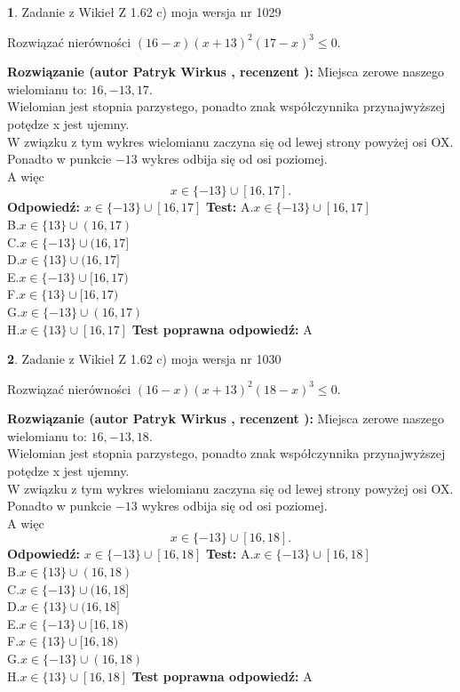 \documentclass[12pt, a4paper]{article}
\theoremstyle{definition} %
\newtheorem{zad}{}
\newcommand{\zadStart}[1]{\begin{zad}#1\newline}
\newcommand{\zadStop}{\end{zad}}
\newcommand{\rozwStart}[2]{\noindent \textbf{Rozwiązanie (autor #1 , recenzent #2): }\newline}
\newcommand{\rozwStop}{\newline}
\newcommand{\odpStart}{\noindent \textbf{Odpowiedź:}\newline}
\newcommand{\odpStop}{\newline}
\newcommand{\testStart}{\noindent \textbf{Test:}\newline}
\newcommand{\testStop}{\newline}
\newcommand{\kluczStart}{\noindent \textbf{Test poprawna odpowiedź:}\newline}
\newcommand{\kluczStop}{\newline}
\begin{document}
\zadStart{Zadanie z Wikieł Z 1.62 c) moja wersja nr 1029}

Rozwiązać nierówności $(16-x)(x+13)^{2}(17-x)^{3}\le0$.
\zadStop
\rozwStart{Patryk Wirkus}{}
Miejsca zerowe naszego wielomianu to: $16, -13, 17$.\\
Wielomian jest stopnia parzystego, ponadto znak współczynnika przy\linebreak najwyższej potędze x jest ujemny.\\ W związku z tym wykres wielomianu zaczyna się od lewej strony powyżej osi OX.\\
Ponadto w punkcie $-13$ wykres odbija się od osi poziomej.\\
A więc $$x \in \{-13\} \cup [16,17].$$
\rozwStop
\odpStart
$x \in \{-13\} \cup [16,17]$
\odpStop
\testStart
A.$x \in \{-13\} \cup [16,17]$\\
B.$x \in \{13\} \cup (16,17)$\\
C.$x \in \{-13\} \cup (16,17]$\\
D.$x \in \{13\} \cup (16,17]$\\
E.$x \in \{-13\} \cup [16,17)$\\
F.$x \in \{13\} \cup [16,17)$\\
G.$x \in \{-13\} \cup (16,17)$\\
H.$x \in \{13\} \cup [16,17]$
\testStop
\kluczStart
A
\kluczStop



\zadStart{Zadanie z Wikieł Z 1.62 c) moja wersja nr 1030}

Rozwiązać nierówności $(16-x)(x+13)^{2}(18-x)^{3}\le0$.
\zadStop
\rozwStart{Patryk Wirkus}{}
Miejsca zerowe naszego wielomianu to: $16, -13, 18$.\\
Wielomian jest stopnia parzystego, ponadto znak współczynnika przy\linebreak najwyższej potędze x jest ujemny.\\ W związku z tym wykres wielomianu zaczyna się od lewej strony powyżej osi OX.\\
Ponadto w punkcie $-13$ wykres odbija się od osi poziomej.\\
A więc $$x \in \{-13\} \cup [16,18].$$
\rozwStop
\odpStart
$x \in \{-13\} \cup [16,18]$
\odpStop
\testStart
A.$x \in \{-13\} \cup [16,18]$\\
B.$x \in \{13\} \cup (16,18)$\\
C.$x \in \{-13\} \cup (16,18]$\\
D.$x \in \{13\} \cup (16,18]$\\
E.$x \in \{-13\} \cup [16,18)$\\
F.$x \in \{13\} \cup [16,18)$\\
G.$x \in \{-13\} \cup (16,18)$\\
H.$x \in \{13\} \cup [16,18]$
\testStop
\kluczStart
A
\kluczStop
\end{document}
